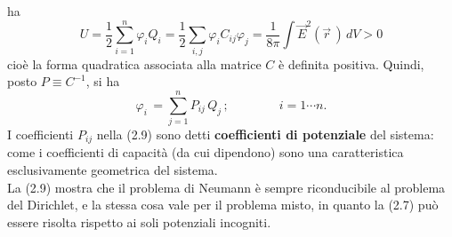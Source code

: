ha
\begin{equation}
  U=\frac12\sum_{i=1}^n\varphi_iQ_i=\frac12\sum_{i,j}\varphi_iC_{ij}\varphi_j
  =\frac{1}{8\pi}\int\vec E^2(\vec r\,)\,dV>0
  \tag{2.8}
\end{equation}
cio\`e la forma quadratica associata alla matrice $C$ \`e definita positiva.
Quindi, posto $P\equiv C^{-1}$, si ha
\begin{equation}
  \varphi_i\,=\sum_{j=1}^nP_{ij}\,Q_j\,;\qquad\qquad i=1\cdots n.
  \tag{2.9}
\end{equation}
I coefficienti $P_{ij}$ nella (2.9) sono detti \textbf{coefficienti di
potenziale} del sistema: come i coefficienti di capacit\`a (da cui dipendono)
sono una caratteristica esclusivamente geometrica del sistema.\\
La (2.9) mostra che il problema di Neumann \`e sempre riconducibile al problema
del
Dirichlet, e la stessa cosa vale per il problema misto, in quanto la (2.7) pu\`o
essere risolta rispetto ai soli potenziali incogniti.

